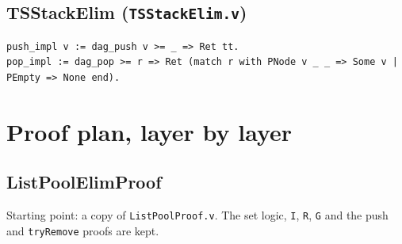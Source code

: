 \documentclass[11pt]{article}
\theoremstyle{definition}
\theoremstyle{remark}
\newcommand{\code}[1]{\texttt{#1}}
\newcommand{\file}[1]{\texttt{#1}}
\begin{document}
\subsection{TSStackElim (\file{TSStackElim.v})}

\begin{lstlisting}
push_impl v := dag_push v >= _ => Ret tt.
pop_impl := dag_pop >= r => Ret (match r with PNode v _ _ => Some v | PEmpty => None end).
\end{lstlisting}

\section{Proof plan, layer by layer}
\label{sec:proofs}

\subsection{ListPoolElimProof}

Starting point: a copy of \file{ListPoolProof.v}. The set logic,
\code{I}, \code{R}, \code{G} and the push and \code{tryRemove} proofs are
kept.
\end{document}
